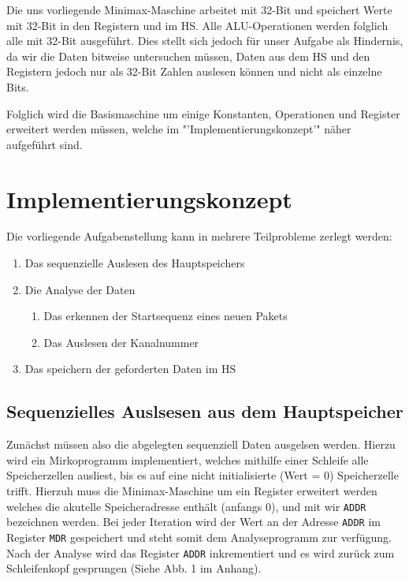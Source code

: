 \documentclass[12pt,titlepage]{article}
\begin{document}
Die uns vorliegende Minimax-Maschine arbeitet mit 32-Bit und speichert Werte mit 32-Bit in den Registern und im HS.
Alle ALU-Operationen werden folglich alle mit 32-Bit ausgef{\"u}hrt. Dies stellt sich jedoch f{\"u}r unser Aufgabe als
Hindernis, da wir die Daten bitweise untersuchen m{\"u}ssen, Daten aus dem HS und den Registern jedoch nur als
32-Bit Zahlen auslesen k{\"o}nnen und nicht als einzelne Bits.

Folglich wird die Basismaschine um einige Konstanten, Operationen und Register erweitert werden müssen, welche im "'Implementierungskonzept'" n{\"a}her
aufgeführt sind.


\section{Implementierungskonzept}
Die vorliegende Aufgabenstellung kann in mehrere Teilprobleme zerlegt werden:
\begin{enumerate}
\item Das sequenzielle Auslesen des Hauptspeichers
\item Die Analyse der Daten
    \begin{enumerate}
    \item Das erkennen der Startsequenz eines neuen Pakets
    \item Das Auslesen der Kanalnummer
    \end{enumerate}
\item Das speichern der geforderten Daten im HS
\end{enumerate}

\subsection{Sequenzielles Auslsesen aus dem Hauptspeicher}
Zun{\"a}chst m{\"u}ssen also die abgelegten sequenziell Daten ausgelsen werden. Hierzu wird ein Mirkoprogramm implementiert, welches mithilfe
einer Schleife alle Speicherzellen ausliest, bis es auf eine nicht initialisierte (Wert = 0) Speicherzelle trifft. 
Hierzuh muss die Minimax-Maschine um ein Register erweitert werden welches die akutelle Speicheradresse enth{\"a}lt (anfangs 0),
und mit wir \texttt{ADDR} bezeichnen werden. Bei jeder Iteration wird der Wert an der Adresse \texttt{ADDR} im Register 
\texttt{MDR} gespeichert und steht somit dem Analyseprogramm zur verf{\"u}gung. Nach der Analyse wird das Register \texttt{ADDR}
inkrementiert und es wird zur{\"u}ck zum Schleifenkopf gesprungen (Siehe Abb. 1 im Anhang).
\end{document}
